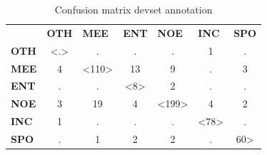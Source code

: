 \documentclass[
10pt, %
a4paper, %
oneside, %
headinclude,footinclude, %
BCOR5mm, %
]{scrartcl}
\begin{document}
\begin{table}[h]
\begin{tabular}{lcccccc}
                                  & \multicolumn{1}{l}{\textbf{OTH}}            & \multicolumn{1}{l}{\textbf{MEE}}              & \multicolumn{1}{l}{\textbf{ENT}}            & \multicolumn{1}{l}{\textbf{NOE}}              & \multicolumn{1}{l}{\textbf{INC}}             & \multicolumn{1}{l}{\textbf{SPO}}    \\ \cline{2-7} 
\multicolumn{1}{l|}{\textbf{OTH}} & \multicolumn{1}{c|}{\textless.\textgreater} & \multicolumn{1}{c|}{.}                        & \multicolumn{1}{c|}{.}                      & \multicolumn{1}{c|}{.}                        & \multicolumn{1}{c|}{1}                       & \multicolumn{1}{c|}{.}              \\ \cline{2-7} 
\multicolumn{1}{l|}{\textbf{MEE}} & \multicolumn{1}{c|}{4}                      & \multicolumn{1}{c|}{\textless110\textgreater} & \multicolumn{1}{c|}{13}                     & \multicolumn{1}{c|}{9}                        & \multicolumn{1}{c|}{.}                       & \multicolumn{1}{c|}{3}              \\ \cline{2-7} 
\multicolumn{1}{l|}{\textbf{ENT}} & \multicolumn{1}{c|}{.}                      & \multicolumn{1}{c|}{.}                        & \multicolumn{1}{c|}{\textless8\textgreater} & \multicolumn{1}{c|}{2}                        & \multicolumn{1}{c|}{.}                       & \multicolumn{1}{c|}{.}              \\ \cline{2-7} 
\multicolumn{1}{l|}{\textbf{NOE}} & \multicolumn{1}{c|}{3}                      & \multicolumn{1}{c|}{19}                       & \multicolumn{1}{c|}{4}                      & \multicolumn{1}{c|}{\textless199\textgreater} & \multicolumn{1}{c|}{4}                       & \multicolumn{1}{c|}{2}              \\ \cline{2-7} 
\multicolumn{1}{l|}{\textbf{INC}} & \multicolumn{1}{c|}{1}                      & \multicolumn{1}{c|}{.}                        & \multicolumn{1}{c|}{.}                      & \multicolumn{1}{c|}{.}                        & \multicolumn{1}{c|}{\textless78\textgreater} & \multicolumn{1}{c|}{.}              \\ \cline{2-7} 
\multicolumn{1}{l|}{\textbf{SPO}} & \multicolumn{1}{c|}{.}                      & \multicolumn{1}{c|}{1}                        & \multicolumn{1}{c|}{2}                      & \multicolumn{1}{c|}{2}                        & \multicolumn{1}{c|}{.}                       & \multicolumn{1}{c|}{60\textgreater} \\ \cline{2-7} 
\end{tabular}
\caption[Table caption text]{Confusion matrix devset annotation }
\end{table}
\end{document}
